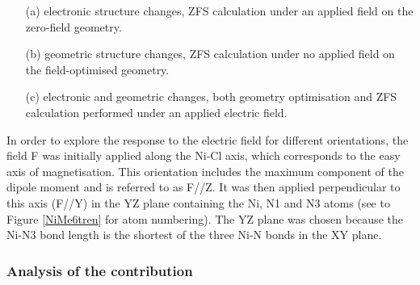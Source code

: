\documentclass[10pt]{report}
\numberwithin{equation}{section}
\begin{document}
\begin{itemize}
    \item[(a)] electronic structure changes, ZFS calculation under an applied field on the zero-field geometry.
    \item[(b)] geometric structure changes, ZFS calculation under no applied field on the field-optimised geometry.
    \item[(c)] electronic and geometric changes, both geometry optimisation and ZFS calculation performed under an applied electric field.
\end{itemize}

In order to explore the response to the electric field for different orientations, the field F was initially applied along the Ni-Cl axis, which corresponds to the easy axis of magnetisation.
This orientation includes the maximum component of the dipole moment and is referred to as F//Z.
It was then applied perpendicular to this axis (F//Y) in the YZ plane containing the Ni, N1 and N3 atoms (see to Figure \ref{NiMe6tren} for atom numbering). 
The YZ plane was chosen because the Ni-N3 bond length is the shortest of the three Ni-N bonds in the XY plane.

\subsubsection*{Analysis of the contribution}
\end{document}
